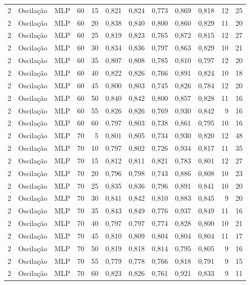 \begin{longtable}{@{}rllrrrrrrrrr@{}}
2 & Oscilação & MLP & 60 & 15 & 0,821 & 0,824 & 0,773 & 0,869 & 0,818 & 12 & 25 \\
2 & Oscilação & MLP & 60 & 20 & 0,838 & 0,840 & 0,800 & 0,860 & 0,829 & 11 & 20 \\
2 & Oscilação & MLP & 60 & 25 & 0,819 & 0,823 & 0,765 & 0,872 & 0,815 & 12 & 27 \\
2 & Oscilação & MLP & 60 & 30 & 0,834 & 0,836 & 0,797 & 0,863 & 0,829 & 10 & 21 \\
2 & Oscilação & MLP & 60 & 35 & 0,807 & 0,808 & 0,785 & 0,810 & 0,797 & 12 & 20 \\
2 & Oscilação & MLP & 60 & 40 & 0,822 & 0,826 & 0,766 & 0,891 & 0,824 & 10 & 18 \\
2 & Oscilação & MLP & 60 & 45 & 0,800 & 0,803 & 0,745 & 0,826 & 0,784 & 12 & 20 \\
2 & Oscilação & MLP & 60 & 50 & 0,840 & 0,842 & 0,800 & 0,857 & 0,828 & 11 & 16 \\
2 & Oscilação & MLP & 60 & 55 & 0,826 & 0,826 & 0,769 & 0,930 & 0,842 & 9 & 16 \\
2 & Oscilação & MLP & 60 & 60 & 0,797 & 0,803 & 0,738 & 0,861 & 0,795 & 10 & 16 \\
2 & Oscilação & MLP & 70 & 5 & 0,801 & 0,805 & 0,734 & 0,930 & 0,820 & 12 & 48 \\
2 & Oscilação & MLP & 70 & 10 & 0,797 & 0,802 & 0,726 & 0,934 & 0,817 & 11 & 35 \\
2 & Oscilação & MLP & 70 & 15 & 0,812 & 0,811 & 0,821 & 0,783 & 0,801 & 12 & 27 \\
2 & Oscilação & MLP & 70 & 20 & 0,796 & 0,798 & 0,743 & 0,886 & 0,808 & 10 & 23 \\
2 & Oscilação & MLP & 70 & 25 & 0,835 & 0,836 & 0,796 & 0,891 & 0,841 & 10 & 20 \\
2 & Oscilação & MLP & 70 & 30 & 0,841 & 0,842 & 0,810 & 0,883 & 0,845 & 9 & 20 \\
2 & Oscilação & MLP & 70 & 35 & 0,843 & 0,849 & 0,776 & 0,937 & 0,849 & 11 & 16 \\
2 & Oscilação & MLP & 70 & 40 & 0,797 & 0,797 & 0,774 & 0,828 & 0,800 & 10 & 21 \\
2 & Oscilação & MLP & 70 & 45 & 0,810 & 0,809 & 0,804 & 0,804 & 0,804 & 11 & 17 \\
2 & Oscilação & MLP & 70 & 50 & 0,819 & 0,818 & 0,814 & 0,795 & 0,805 & 9 & 16 \\
2 & Oscilação & MLP & 70 & 55 & 0,779 & 0,778 & 0,766 & 0,818 & 0,791 & 9 & 15 \\
2 & Oscilação & MLP & 70 & 60 & 0,823 & 0,826 & 0,761 & 0,921 & 0,833 & 9 & 11 \\

\end{longtable}

